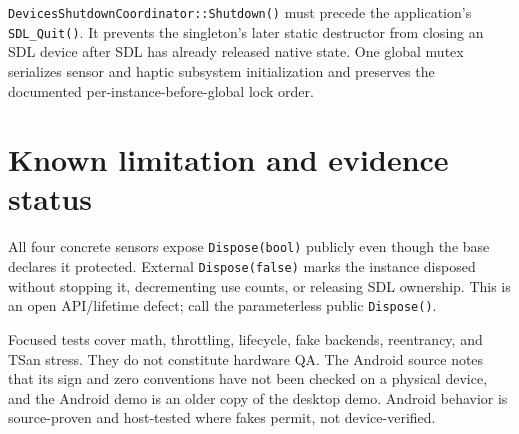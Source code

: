 \texttt{DevicesShutdownCoordinator::Shutdown()} must precede the application's
\texttt{SDL\_Quit()}. It prevents the singleton's later static destructor from closing an SDL
device after SDL has already released native state. One global mutex serializes sensor and
haptic subsystem initialization and preserves the documented per-instance-before-global lock
order.

\section{Known limitation and evidence status}

All four concrete sensors expose \texttt{Dispose(bool)} publicly even though the base declares
it protected. External \texttt{Dispose(false)} marks the instance disposed without stopping it,
decrementing use counts, or releasing SDL ownership. This is an open API/lifetime defect; call
the parameterless public \texttt{Dispose()}.

Focused tests cover math, throttling, lifecycle, fake backends, reentrancy, and TSan stress.
They do not constitute hardware QA. The Android source notes that its sign and zero conventions
have not been checked on a physical device, and the Android demo is an older copy of the desktop
demo. Android behavior is source-proven and host-tested where fakes permit, not device-verified.
